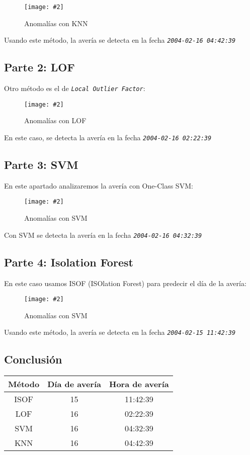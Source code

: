 \documentclass[
12pt, 
spanish, 
singlespacing,
headsepline
]{article}
\newcommand{\smallimage}[2]{
\begin{figure}[H]
	\caption{#1}
	\centering
	\texttt{[image: \#2]}
\end{figure}
}
\newcommand{\code}[1]{\textit{\texttt{#1}}}
\begin{document}
\smallimage{Anomalías con KNN}{PL7/Anomaly.png}

Usando este método, la avería se detecta en la fecha \code{2004-02-16 04:42:39}

\subsection{Parte 2: LOF}
Otro método es el de \code{Local Outlier Factor}:

\smallimage{Anomalías con LOF}{PL7/AnomalyLOF.png}

En este caso, se detecta la avería en la fecha \code{2004-02-16 02:22:39}

\subsection{Parte 3: SVM}
En este apartado analizaremos la avería con One-Class SVM:

\smallimage{Anomalías con SVM}{PL7/AnomalySVM.png}

Con SVM se detecta la avería en la fecha \code{2004-02-16 04:32:39}

\subsection{Parte 4: Isolation Forest}

En este caso usamos ISOF (ISOlation Forest) para predecir el día de la avería:

\smallimage{Anomalías con SVM}{PL7/AnomalyISOF.png}

Usando este método, la avería se detecta en la fecha \code{2004-02-15 11:42:39}

\subsection{Conclusión}

\begin{center}
\begin{tabular}{ |c|c|c| }
 \hline
 Método & Día de avería & Hora de avería \\ 
 \hline
 ISOF & 15 & 11:42:39 \\
 LOF & 16 & 02:22:39 \\
 SVM & 16 & 04:32:39 \\
 KNN & 16 & 04:42:39 \\
 \hline
\end{tabular}
\end{center}
\end{document}
